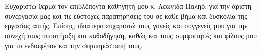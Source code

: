 \chapter*{\cseeuxaristies}

\noindent Ευχαριστώ θερμά τον επιβλέποντα καθηγητή μου κ. Λεωνίδα Παληό, για την άριστη συνεργασία μας και τις εύστοχες παρατηρήσεις του σε κάθε βήμα και δυσκολία της εργασίας αυτής. 
Επίσης, ιδιαίτερα ευχαριστώ τους γονείς και συγγενείς μου για την συνεχή τους υποστήριξη και καθοδήγηση, καθώς και τους συμφοιτητές και φίλους μου για το ενδιαφέρον και την συμπαράστασή τους.